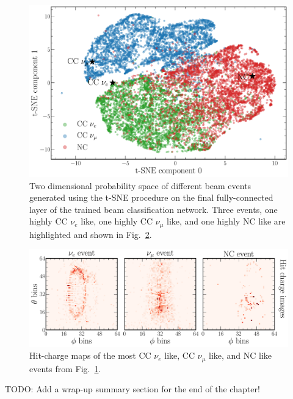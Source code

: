 \begin{figure} %
    \includegraphics[width=\textwidth]{diagrams/6-cvn/chipsnet/final_beam_tsne.pdf}
    \caption[Beam classification network t-SNE space.]
    {Two dimensional probability space of different beam events generated using the t-SNE
        procedure on the final fully-connected layer of the trained beam classification network.
        Three events, one highly CC $\nu_{e}$ like, one highly CC $\nu_{\mu}$ like, and one highly
        NC like are highlighted and shown in Fig.~\ref{fig:final_beam_tsne_events}.}
    \label{fig:final_beam_tsne}
\end{figure}

\begin{figure} %
    \includegraphics[width=\textwidth]{diagrams/6-cvn/chipsnet/final_beam_tsne_events.pdf}
    \caption[Hit-charge maps of highly CC $\nu_{e}$ like, CC $\nu_{\mu}$ like, and NC like events.]
    {Hit-charge maps of the most CC $\nu_{e}$ like, CC $\nu_{\mu}$ like, and NC like events from
        Fig.~\ref{fig:final_beam_tsne}.}
    \label{fig:final_beam_tsne_events}
\end{figure}

TODO: Add a wrap-up summary section for the end of the chapter!